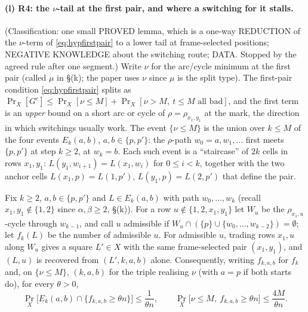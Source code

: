 \paragraph{(l) R4: the $\nu$-tail at the first pair, and where a switching
for it stalls.}  (Classification: one small PROVED lemma, which is a
one-way REDUCTION of the $\nu$-term of \eqref{eq:hypfirstpair} to a
lower tail at frame-selected positions; NEGATIVE KNOWLEDGE about the
switching route; DATA.  Stopped by the agreed rule after one segment.)
Write $\nu$ for the arc/cycle minimum at the first pair (called $\mu$
in \S(k); the paper uses $\nu$ since $\mu$ is the split type).  The
first-pair condition \eqref{eq:hypfirstpair} splits as
$\Pr_X[G^c]\le\Pr_X[\nu\le M]+\Pr_X[\nu>M,\ t\le M\text{ all bad}]$,
and the first term is an \emph{upper} bound on a short arc or cycle of
$\rho=\rho_{x_1,y_1}$ at the mark, the direction in which switchings
usually work.  The event $\{\nu\le M\}$ is the union over $k\le M$ of
the four events $E_k(a,b)$, $a,b\in\{p,p'\}$: the $\rho$-path
$w_0=a,w_1,\dots$ first meets $\{p,p'\}$ at step $k\ge2$, at $w_k=b$.
Each such event is a ``staircase'' of $2k$ cells in rows $x_1,y_1$:
$L(y_1,w_{i+1})=L(x_1,w_i)$ for $0\le i<k$, together with the two anchor
cells $L(x_1,p)=L(1,p')$, $L(y_1,p)=L(2,p')$ that define the pair.

\begin{lemma}\label{lem:nuswitch}
Fix $k\ge2$, $a,b\in\{p,p'\}$ and $L\in E_k(a,b)$ with path $w_0,\dots,w_k$ (recall
$x_1,y_1\notin\{1,2\}$ since $\alpha,\beta\ge2$, \S(k)).  For a row
$u\notin\{1,2,x_1,y_1\}$ let $W_u$ be the $\rho_{x_1,u}$-cycle through $w_{k-1}$, and call
$u$ admissible if $W_u\cap(\{p\}\cup\{w_0,\dots,w_{k-2}\})=\emptyset$; let $f_k(L)$ be the
number of admissible $u$.  For admissible $u$, trading rows $x_1,u$ along $W_u$ gives a
square $L'\in X$ with the same frame-selected pair $(x_1,y_1)$, and $(L,u)$ is recovered
from $(L',k,a,b)$ alone.  Consequently, writing $f_{k,a,b}$ for $f_k$ and, on
$\{\nu\le M\}$, $(k,a,b)$ for the triple realising $\nu$ (with $a=p$ if both starts do),
for every $\theta>0$,
\[
\Pr_X\bigl[E_k(a,b)\cap\{f_{k,a,b}\ge\theta n\}\bigr]\le\frac1{\theta n},\qquad
\Pr_X\bigl[\nu\le M,\ f_{k,a,b}\ge\theta n\bigr]\le\frac{4M}{\theta n}.
\]
\end{lemma}

